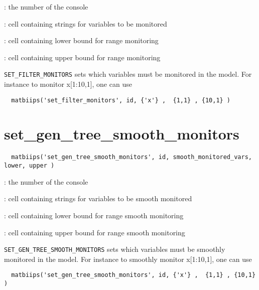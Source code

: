\documentclass[11pt,twoside]{article}
\begin{document}
   \begin{description}
   \setlength{\baselineskip}{0.1\baselineskip}
     \item[\texttt{id}]: the number of the console
     \item[\texttt{monitored\_vars}]: cell containing strings for variables to be monitored
     \item[\texttt{lower}]: cell containing lower bound for range monitoring
     \item[\texttt{upper}]: cell containing upper bound for range monitoring

   \end{description}

   \texttt{SET\_FILTER\_MONITORS} sets which variables must be monitored in the model. For instance to monitor x[1:10,1], one can use
 \begin{lstlisting}
  matbiips('set_filter_monitors', id, {'x'} ,  {1,1} , {10,1} )
 \end{lstlisting}

\section{set\_gen\_tree\_smooth\_monitors}

 \begin{lstlisting}
  matbiips('set_gen_tree_smooth_monitors', id, smooth_monitored_vars, lower, upper )
 \end{lstlisting}

   \begin{description}
   \setlength{\baselineskip}{0.1\baselineskip}
     \item[\texttt{id}]: the number of the console
     \item[\texttt{smooth\_monitored\_vars}]: cell containing strings for variables to be smooth monitored
     \item[\texttt{lower}]: cell containing lower bound for range smooth monitoring
     \item[\texttt{upper}]: cell containing upper bound for range smooth monitoring

   \end{description}

   \texttt{SET\_GEN\_TREE\_SMOOTH\_MONITORS} sets which variables must be smoothly monitored in the model. For instance to smoothly monitor x[1:10,1], one can use
 \begin{lstlisting}
  matbiips('set_gen_tree_smooth_monitors', id, {'x'} ,  {1,1} , {10,1} )
 \end{lstlisting}
\end{document}
